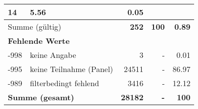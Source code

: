 \begin{longtable}{lXrrr}
       \num{14} &
       \num[round-mode=places,round-precision=2]{5.56} &
         \num[round-mode=places,round-precision=2]{0.05} \\
     \midrule
     \multicolumn{2}{l}{Summe (gültig)} &
       \textbf{\num{252}} &
     \textbf{\num{100}} &
       \textbf{\num[round-mode=places,round-precision=2]{0.89}} \\
     \multicolumn{5}{l}{\textbf{Fehlende Werte}}\\
       -998 &
       keine Angabe &
         \num{3} &
        - &
         \num[round-mode=places,round-precision=2]{0.01} \\
       -995 &
       keine Teilnahme (Panel) &
         \num{24511} &
        - &
         \num[round-mode=places,round-precision=2]{86.97} \\
       -989 &
       filterbedingt fehlend &
         \num{3416} &
        - &
         \num[round-mode=places,round-precision=2]{12.12} \\
     \midrule
     \multicolumn{2}{l}{\textbf{Summe (gesamt)}} &
          \textbf{\num{28182}} &
        \textbf{-} &
        \textbf{\num{100}} \\
     \bottomrule
     \end{longtable}
     
